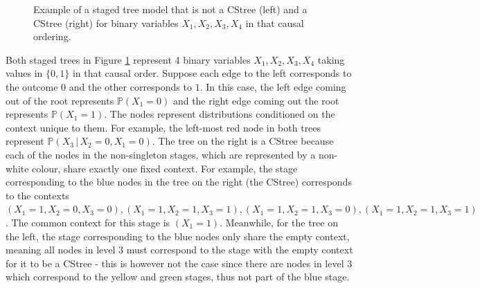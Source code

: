 \documentclass{tufte-book}
\begin{document}
\begin{figure}[!h]\label{fig:cstreestagedtree}
   \begin{floatrow}
%
\caption{Example of a staged tree model that is not a CStree (left) and a CStree (right) for binary variables $X_1,X_2,X_3,X_4$ in that causal ordering.}
        
   \end{floatrow}
\end{figure}

Both staged trees in Figure \ref{fig:cstreestagedtree} represent 4 binary variables \(X_1,X_2,X_3,X_4\) taking values in \(\{0,1\}\) in that causal order. Suppose each edge to the left corresponds to the outcome \(0\) and the other corresponds to \(1\). In this case, the left edge coming out of the root represents \(\mathbb{P}(X_1 = 0)\) and the right edge coming out the root represents \(\mathbb{P}(X_1 = 1)\). The nodes represent distributions conditioned on the context unique to them. For example, the left-most red node in both trees represent \(\mathbb{P}(X_3 \,|\, X_2=0, X_1=0)\). The tree on the right is a CStree because each of the nodes in the non-singleton stages, which are represented by a non-white colour, share exactly one fixed context. For example, the stage corresponding to the blue nodes in the tree on the right (the CStree) corresponds to the contexts \((X_1=1, X_2=0, X_3=0), (X_1=1, X_2=1, X_3=1), (X_1=1, X_2=1, X_3=0), (X_1=1, X_2=1, X_3=1)\). The common context for this stage is  \((X_1=1)\). Meanwhile, for the tree on the left, the stage corresponding to the blue nodes only share the empty context, meaning all nodes in level 3 must correspond to the stage with the empty context for it to be a CStree - this is however not the case since there are nodes in level 3 which correspond to the yellow and green stages, thus not part of the blue stage. 
\end{document}
